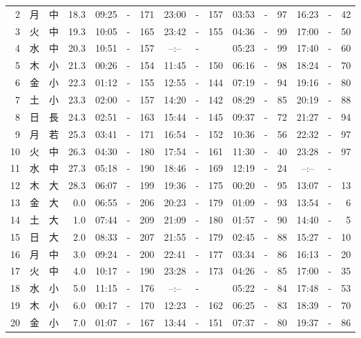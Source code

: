 \documentclass[12pt.a4j]{jsarticle}
\begin{document}
\begin{center}
\begin{table}[ht]
\begin{tabular}{|rc|cr|ccrccr|ccrccr|}
 2 & 月 & 中 & 18.3 &  09:25 &-& 171  &  23:00 &-& 157  &   03:53 &-&  97  &   16:23 &-&  42  \\
 3 & 火 & 中 & 19.3 &  10:05 &-& 165  &  23:42 &-& 155  &   04:36 &-&  99  &   17:00 &-&  50  \\
 4 & 水 & 中 & 20.3 &  10:51 &-& 157  &  --:-- &-&     &   05:23 &-&  99  &   17:40 &-&  60  \\
 5 & 木 & 小 & 21.3 &  00:26 &-& 154  &  11:45 &-& 150  &   06:16 &-&  98  &   18:24 &-&  70  \\
 6 & 金 & 小 & 22.3 &  01:12 &-& 155  &  12:55 &-& 144  &   07:19 &-&  94  &   19:16 &-&  80  \\
 7 & 土 & 小 & 23.3 &  02:00 &-& 157  &  14:20 &-& 142  &   08:29 &-&  85  &   20:19 &-&  88  \\
 8 & 日 & 長 & 24.3 &  02:51 &-& 163  &  15:44 &-& 145  &   09:37 &-&  72  &   21:27 &-&  94  \\
 9 & 月 & 若 & 25.3 &  03:41 &-& 171  &  16:54 &-& 152  &   10:36 &-&  56  &   22:32 &-&  97  \\
10 & 火 & 中 & 26.3 &  04:30 &-& 180  &  17:54 &-& 161  &   11:30 &-&  40  &   23:28 &-&  97  \\
11 & 水 & 中 & 27.3 &  05:18 &-& 190  &  18:46 &-& 169  &   12:19 &-&  24  &   --:-- &-&     \\
12 & 木 & 大 & 28.3 &  06:07 &-& 199  &  19:36 &-& 175  &   00:20 &-&  95  &   13:07 &-&  13  \\
13 & 金 & 大 &  0.0 &  06:55 &-& 206  &  20:23 &-& 179  &   01:09 &-&  93  &   13:54 &-&   6  \\
14 & 土 & 大 &  1.0 &  07:44 &-& 209  &  21:09 &-& 180  &   01:57 &-&  90  &   14:40 &-&   5  \\
15 & 日 & 大 &  2.0 &  08:33 &-& 207  &  21:55 &-& 179  &   02:45 &-&  88  &   15:27 &-&  10  \\
16 & 月 & 中 &  3.0 &  09:24 &-& 200  &  22:41 &-& 177  &   03:34 &-&  86  &   16:13 &-&  20  \\
17 & 火 & 中 &  4.0 &  10:17 &-& 190  &  23:28 &-& 173  &   04:26 &-&  85  &   17:00 &-&  35  \\
18 & 水 & 小 &  5.0 &  11:15 &-& 176  &  --:-- &-&     &   05:22 &-&  84  &   17:48 &-&  53  \\
19 & 木 & 小 &  6.0 &  00:17 &-& 170  &  12:23 &-& 162  &   06:25 &-&  83  &   18:39 &-&  70  \\
20 & 金 & 小 &  7.0 &  01:07 &-& 167  &  13:44 &-& 151  &   07:37 &-&  80  &   19:37 &-&  86  \\

\end{tabular}
\end{table}
\end{center}
\end{document}
